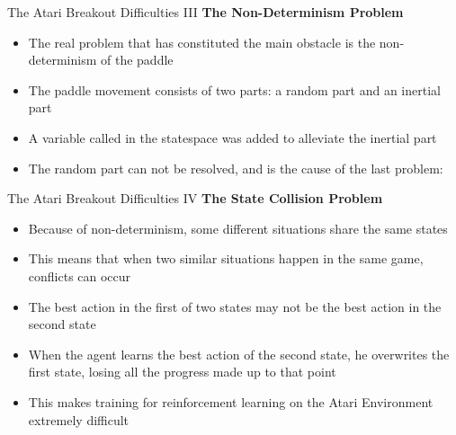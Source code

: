 \begin{frame}{The Atari Breakout Difficulties III}
\textbf{The Non-Determinism Problem}
    \begin{itemize}
	\item The real problem that has constituted the main obstacle is the non-determinism of the paddle
	\item The paddle movement consists of two parts: a random part and an inertial part
	\item A variable called  in the statespace was added to alleviate the inertial part 
	\item The random part can not be resolved, and is the cause of the last problem:
    \end{itemize}
\end{frame}

\begin{frame}{The Atari Breakout Difficulties IV}
\textbf{The State Collision Problem}
    \begin{itemize}
	\item Because of non-determinism, some different situations share the same states
	\item This means that when two similar situations happen in the same game, conflicts can occur
	\item The best action in the first of two states may not be the best action in the second state
	\item When the agent learns the best action of the second state, he overwrites the first state, losing all the progress made up to that point
	\item This makes training for reinforcement learning on the Atari Environment extremely difficult
    \end{itemize}
\end{frame}

